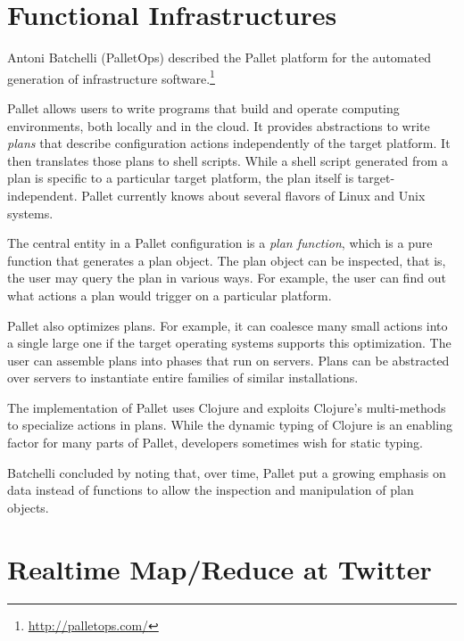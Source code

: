 \documentclass{jfp1}
\begin{document}
\section{Functional Infrastructures}

Antoni Batchelli (PalletOps) described the Pallet platform for the
automated generation of infrastructure
software.\footnote{\url{http://palletops.com/}}

Pallet allows users to write programs that build and operate computing
environments, both locally and in the cloud. It provides abstractions to
write \textit{plans} that describe configuration actions independently of
the target platform.  It then translates those plans to shell scripts.
While a shell script generated from a plan is specific to a particular
target platform, the plan itself is target-independent.  Pallet currently
knows about several flavors of Linux and Unix systems.

The central entity in a Pallet configuration is a \textit{plan function},
which is a pure function that generates a plan object.  The plan object
can be inspected, that is, the user may query the plan in various
ways. For example, the user can find out what actions a plan would trigger
on a particular platform.

Pallet also optimizes plans.  For example, it can coalesce many small
actions into a single large one if the target operating systems supports
this optimization.  The user can assemble plans into phases that run on
servers. Plans can be abstracted over servers to instantiate entire
families of similar installations.

The implementation of Pallet uses Clojure and exploits Clojure's
multi-methods to specialize actions in plans. While the dynamic typing of
Clojure is an enabling factor for many parts of Pallet, developers
sometimes wish for static typing.

Batchelli concluded by noting that, over time, Pallet put a growing
emphasis on data instead of functions to allow the inspection and
manipulation of plan objects.


\section{Realtime Map/Reduce at Twitter}

\end{document}
